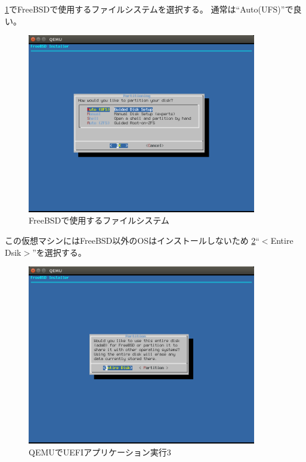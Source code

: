\documentclass[a4j]{jarticle}
\begin{document}
\ref{fig:FreeBSD_FS}でFreeBSDで使用するファイルシステムを選択する。
通常は``Auto(UFS)''で良い。
\begin{figure}[htbp]
	\begin{center}
    	\includegraphics[width=10cm]{./IMG/FreeBSD_AUTO.png}
	\end{center}
    \caption{FreeBSDで使用するファイルシステム}
    \label{fig:FreeBSD_FS}
\end{figure}
この仮想マシンにはFreeBSD以外のOSはインストールしないため
\ref{fig:FreeBSD_Q}``$<$Entire Dsik$>$''を選択する。
\begin{figure}[htbp]
	\begin{center}
    	\includegraphics[width=10cm]{./IMG/FreeBSD_ENTRY.png}
	\end{center}
    \caption{QEMUでUEFIアプリケーション実行3}
    \label{fig:FreeBSD_Q}
\end{figure}
\end{document}

